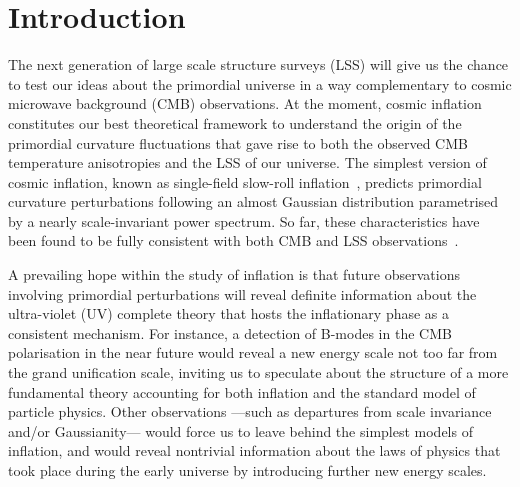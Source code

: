 \documentclass[12pt]{article}
\begin{document}
\hypersetup{linktocpage}
\noindent\makebox[\linewidth]{\rule{\textwidth}{1.3pt}}
\tableofcontents
\noindent\makebox[\linewidth]{\rule{\textwidth}{1.3pt}}








\renewcommand{\theequation}{\arabic{section}.\arabic{equation}}
\setcounter{page}{1}



\section{Introduction} \label{s1:Intro}


The next generation of large scale structure surveys (LSS) will give us the chance to test our ideas about the primordial universe in a way complementary to cosmic microwave background (CMB) observations. At the moment, cosmic inflation~\cite{Guth:1980zm,Starobinsky:1980te} constitutes our best theoretical framework to understand the origin of the primordial curvature fluctuations that gave rise to both the observed CMB temperature anisotropies and the LSS of our universe. The simplest version of cosmic inflation, known as single-field slow-roll inflation~\cite{Linde:1981mu,Albrecht:1982wi}, predicts primordial curvature perturbations following an almost Gaussian distribution parametrised by a nearly scale-invariant power spectrum. So far, these characteristics have been found to be fully consistent with both CMB and LSS observations~\cite{planck,Ade:2015ava}.

A prevailing hope within the study of inflation is that future observations involving primordial perturbations will reveal definite information about the ultra-violet (UV) complete theory that hosts the inflationary phase as a consistent mechanism. For instance, a detection of B-modes in the CMB polarisation in the near future would reveal a new energy scale not too far from the grand unification scale, inviting us to speculate about the structure of a more fundamental theory accounting for both inflation and the standard model of particle physics. Other observations ---such as departures from scale invariance and/or Gaussianity--- would force us to leave behind the simplest models of inflation, and would reveal nontrivial information about the laws of physics that took place during the early universe by introducing further new energy scales. 
\end{document}
